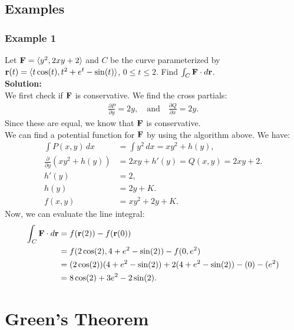 \subsection{Examples}

\subsubsection{Example 1}

Let \(\mathbf{F} = \langle y^{2}, 2xy + 2 \rangle\) and \(C\) be the curve parameterized by \(\mathbf{r}(t) = \langle t\cos(t), t^{2} + e^{t} - \sin(t) \rangle\), \(0 \leq t \leq 2\). Find \(\int_C \mathbf{F} \cdot d\mathbf{r}\). \\

\textbf{Solution:} \\
We first check if \(\mathbf{F}\) is conservative. We find the cross partials:
\begin{align*}
    \frac{\partial P}{\partial y} = 2y, \quad \text{and} \quad 
    \frac{\partial Q}{\partial x} = 2y.
\end{align*}
Since these are equal, we know that \(\mathbf{F}\) is conservative. \\

We can find a potential function for \(\mathbf{F}\) by using the algorithm above. We have:
\begin{align*}
    \int P(x,y) \, dx &= \int y^{2} \, dx = xy^{2} + h(y), \\
    \frac{\partial}{\partial y} (xy^{2} + h(y)) &= 2xy + h'(y) = Q(x,y) = 2xy + 2. \\
    h'(y) &= 2, \\
    h(y) &= 2y + K. \\
    f(x,y) &= xy^{2} + 2y + K.
\end{align*}
Now, we can evaluate the line integral:
\begin{align*}
    \int_C \mathbf{F} \cdot d\mathbf{r} &= f(\mathbf{r}(2)) - f(\mathbf{r}(0)) \\
    &= f(2\cos(2), 4 + e^{2} - \sin(2)) - f(0, e^{2}) \\
    &= (2\cos(2))(4 + e^{2} - \sin(2)) + 2(4 + e^{2} - \sin(2)) - (0) - (e^{2}) \\ 
    &= 8\cos(2) + 3e^{2} - 2\sin(2).
\end{align*}

\newpage

\section{Green's Theorem}

